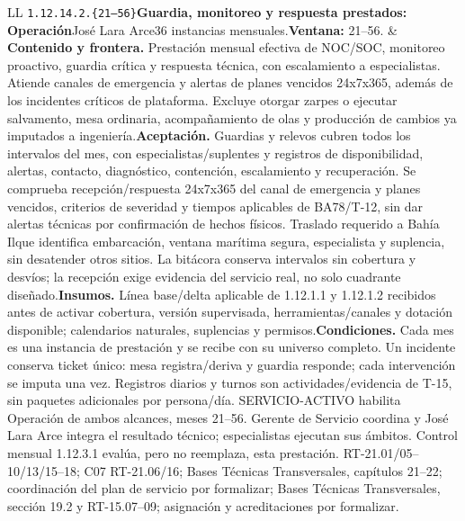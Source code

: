 \begin{longtable}{L{\tabcolsep\relax}L{\tabcolsep\relax}}
\texttt{1.\allowbreak{}12.\allowbreak{}14.\allowbreak{}2.\allowbreak{}\{21--56\}}\newline{}\textbf{Guardia, monitoreo y respuesta prestados: Operación}\newline{}José Lara Arce\newline{}36 instancias mensuales.\newline{}\textbf{Ventana:} 21--56. & \textbf{Contenido y frontera.} Prestación mensual efectiva de NOC/SOC, monitoreo proactivo, guardia crítica y respuesta técnica, con escalamiento a especialistas. Atiende canales de emergencia y alertas de planes vencidos 24x7x365, además de los incidentes críticos de plataforma. Excluye otorgar zarpes o ejecutar salvamento, mesa ordinaria, acompañamiento de olas y producción de cambios ya imputados a ingeniería.\newline{}\textbf{Aceptación.} Guardias y relevos cubren todos los intervalos del mes, con especialistas/suplentes y registros de disponibilidad, alertas, contacto, diagnóstico, contención, escalamiento y recuperación. Se comprueba recepción/respuesta 24x7x365 del canal de emergencia y planes vencidos, criterios de severidad y tiempos aplicables de BA78/T-12, sin dar alertas técnicas por confirmación de hechos físicos. Traslado requerido a Bahía Ilque identifica embarcación, ventana marítima segura, especialista y suplencia, sin desatender otros sitios. La bitácora conserva intervalos sin cobertura y desvíos; la recepción exige evidencia del servicio real, no solo cuadrante diseñado.\newline{}\textbf{Insumos.} Línea base/delta aplicable de 1.12.1.1 y 1.12.1.2 recibidos antes de activar cobertura, versión supervisada, herramientas/canales y dotación disponible; calendarios naturales, suplencias y permisos.\newline{}\textbf{Condiciones.} Cada mes es una instancia de prestación y se recibe con su universo completo. Un incidente conserva ticket único: mesa registra/deriva y guardia responde; cada intervención se imputa una vez. Registros diarios y turnos son actividades/evidencia de T-15, sin paquetes adicionales por persona/día. SERVICIO-ACTIVO habilita Operación de ambos alcances, meses 21--56. Gerente de Servicio coordina y José Lara Arce integra el resultado técnico; especialistas ejecutan sus ámbitos. Control mensual 1.12.3.1 evalúa, pero no reemplaza, esta prestación. RT-21.01/05--10/13/15--18; C07 RT-21.06/16; Bases Técnicas Transversales, capítulos 21--22; coordinación del plan de servicio por formalizar; Bases Técnicas Transversales, sección 19.2 y RT-15.07--09; asignación y acreditaciones por formalizar.\\\hline
\end{longtable}\endgroup
